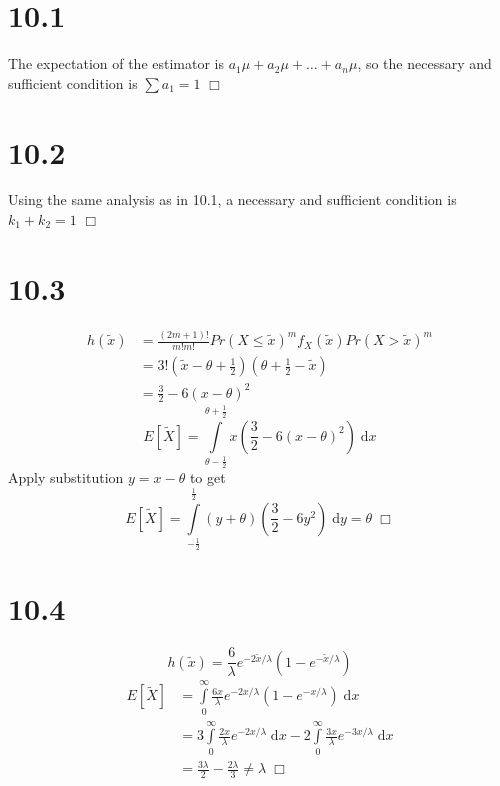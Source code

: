 \documentclass{article}
\begin{document}
\section*{10.1}
The expectation of the estimator is $a_1\mu + a_2 \mu + \dots + a_n\mu$, so the necessary and sufficient condition is $\sum a_1 = 1$ $\Box$

\section*{10.2}
Using the same analysis as in 10.1, a necessary and sufficient condition is $k_1 + k_2 = 1$ $\Box$

\section*{10.3}
\begin{equation*}
\begin{split}
  h(\tilde{x}) &= \frac{(2m+1)!}{m!m!} Pr(X \leq \tilde{x})^m f_X(\tilde{x}) Pr(X > \tilde{x})^m\\
  &= 3! (\tilde{x} - \theta + \frac{1}{2})(\theta + \frac{1}{2} - \tilde{x})\\
  &= \frac{3}{2} - 6(x-\theta)^2
\end{split}
\end{equation*}
$$E[\tilde{X}] = \int\limits_{\theta - \frac{1}{2}}^{\theta + \frac{1}{2}} x \left(\frac{3}{2} - 6(x-\theta)^2 \right)\; \mathrm{d}x$$
Apply substitution $y = x - \theta$ to get
$$E[\tilde{X}] = \int\limits_{-\frac{1}{2}}^{\frac{1}{2}} (y+\theta) \left(\frac{3}{2} - 6y^2 \right)\; \mathrm{d}y = \theta \; \Box$$

\section*{10.4}
$$h(\tilde{x}) = \frac{6}{\lambda} e^{-2\tilde{x}/\lambda}(1-e^{-\tilde{x}/\lambda})$$
\begin{equation*}
\begin{split}
  E[\tilde{X}] &= \int\limits_0^\infty \frac{6x}{\lambda} e^{-2x/\lambda}(1-e^{-x/\lambda}) \; \textrm{d}x\\
  &= 3 \int\limits_0^\infty \frac{2x}{\lambda} e^{-2x/\lambda}\; \textrm{d}x - 2\int\limits_0^\infty \frac{3x}{\lambda} e^{-3x/\lambda}\; \textrm{d}x\\
  &= \frac{3\lambda}{2} - \frac{2\lambda}{3} \neq \lambda \; \Box
\end{split}
\end{equation*}
\end{document}
